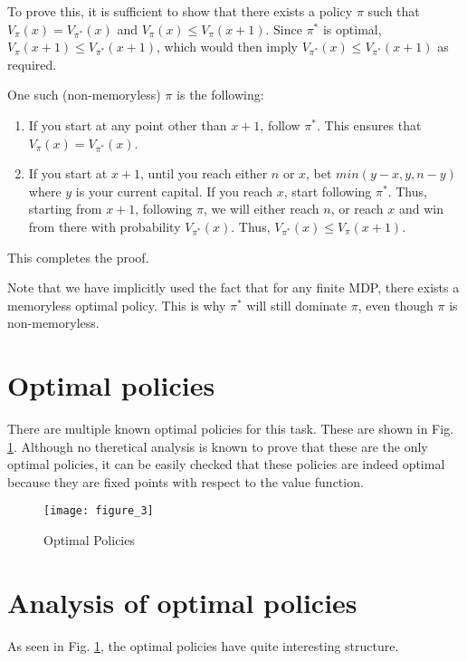 \documentclass{article}
\begin{document}
To prove this, it is sufficient to show that there exists a policy $\pi$ such that $V_{\pi}(x) = V_{\pi^*}(x)$ and $V_{\pi}(x) \leq V_{\pi}(x+1)$. Since $\pi^*$ is optimal, $V_{\pi}(x+1) \leq V_{\pi^*}(x+1)$, which would then imply $V_{\pi^*}(x) \leq V_{\pi^*}(x+1)$ as required.

One such (non-memoryless) $\pi$ is the following:
\begin{enumerate}
    \item If you start at any point other than $x+1$, follow $\pi^*$. This ensures that $V_{\pi}(x) = V_{\pi^*}(x)$.
    \item If you start at $x+1$, until you reach either $n$ or $x$, bet $min(y-x, y, n-y)$ where $y$ is your current capital. If you reach $x$, start following $\pi^*$. Thus, starting from $x+1$, following $\pi$, we will either reach $n$, or reach $x$ and win from there with probability $V_{\pi^*}(x)$. Thus, $V_{\pi^*}(x) \leq V_{\pi}(x+1)$.
\end{enumerate}

This completes the proof.

Note that we have implicitly used the fact that for any finite MDP, there exists a memoryless optimal policy. This is why $\pi^*$ will still dominate $\pi$, even though $\pi$ is non-memoryless.

\section{Optimal policies}

There are multiple known optimal policies for this task. These are shown in Fig. \ref{opt_policies}. Although no theretical analysis is known to prove that these are the only optimal policies, it can be easily checked that these policies are indeed optimal because they are fixed points with respect to the value function.

\begin{figure}
    \centering
    \texttt{[image: figure\_3]}
    \caption{Optimal Policies}
    \label{opt_policies}
\end{figure}


\section{Analysis of optimal policies}

As seen in Fig. \ref{opt_policies}, the optimal policies have quite interesting structure.
\end{document}
